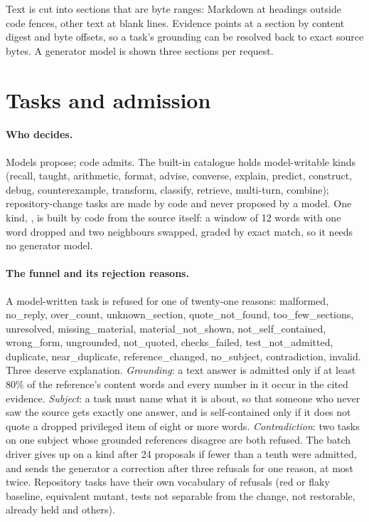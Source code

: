Text is cut into sections that are byte ranges: Markdown at headings outside code
fences, other text at blank lines. Evidence points at a section by content digest and
byte offsets, so a task's grounding can be resolved back to exact source bytes.
A generator model is shown three sections per request.

\section{Tasks and admission}\label{sec:admission}

\paragraph{Who decides.} Models propose; code admits. The built-in catalogue
holds model-writable kinds (recall, taught, arithmetic, format, advise, converse,
explain, predict, construct, debug, counterexample, transform, classify, retrieve,
multi-turn, combine); repository-change tasks are made by code and never proposed by a
model. One kind, , is built by code from the source itself: a
window of 12 words with one word dropped and two neighbours swapped, graded by exact
match, so it needs no generator model.

\paragraph{The funnel and its rejection reasons.} A model-written task is refused for
one of twenty-one reasons: malformed, no\_reply, over\_count, unknown\_section,
quote\_not\_found, too\_few\_sections, unresolved, missing\_material,
material\_not\_shown, not\_self\_contained, wrong\_form, ungrounded, not\_quoted,
checks\_failed, test\_not\_admitted, duplicate, near\_duplicate, reference\_changed,
no\_subject, contradiction, invalid. Three deserve explanation. \emph{Grounding}:
a text answer is admitted only if at least 80\% of the reference's content words and
every number in it occur in the cited evidence. \emph{Subject}: a task must name
what it is about, so that someone who never saw the source gets exactly one answer, and
is self-contained only if it does not quote a dropped privileged item of eight or more
words. \emph{Contradiction}: two tasks on one subject whose grounded references
disagree are both refused. The batch driver gives up on a kind after 24
proposals if fewer than a tenth were admitted, and sends the generator a correction after
three refusals for one reason, at most twice. Repository tasks have their own
vocabulary of refusals (red or flaky baseline, equivalent mutant, tests not separable
from the change, not restorable, already held and others).

